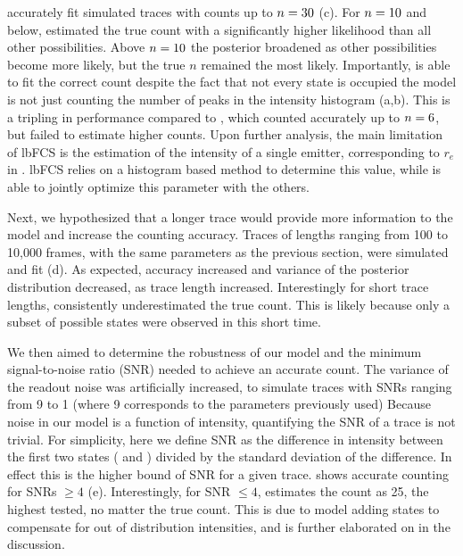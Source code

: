 \ours accurately fit simulated traces with counts up to $n=30$ (c).
	For $n=10$ and below, \ours estimated the true count with a significantly 
	higher likelihood than all other possibilities. 
	Above $n=10$ the posterior broadened as other possibilities become more likely, 
	but the true $n$ remained the most likely.
	Importantly, \ours is able to fit the correct count despite the fact that 
	not every state is occupied \ie the model is not just counting the 
	number of peaks in the intensity histogram (a,b).
	This is a tripling in performance compared to \lbfcs, which counted 
	accurately up to $n=6$, but failed to estimate higher counts.
	Upon further analysis, the main limitation of lbFCS is the estimation of the 
	intensity of a single emitter, corresponding to $r_e$ in \ours. 
	lbFCS relies on a histogram based method to determine this value, while 
	\ours is able to jointly optimize this parameter with the others.

Next, we hypothesized that a longer trace would provide more 
information to the model and increase the counting accuracy.
	Traces of lengths ranging from 100 to 10,000 frames, with the same parameters 
	as the previous section, were simulated and fit (d).
	As expected, accuracy increased and variance of the posterior distribution decreased, 
	as trace length increased.
	Interestingly for short trace lengths, \ours consistently underestimated the true count. 
	This is likely because only a subset of possible states were observed in this short time. %

We then aimed to determine the robustness of our model and the minimum signal-to-noise ratio 
(SNR) needed to achieve an accurate count.
	The variance of the readout noise \camvar was artificially increased, 
	to simulate traces with SNRs ranging from 9 to 1 (where 9 
	corresponds to the parameters previously used)
	Because noise in our model is a function of intensity, quantifying the SNR of a trace 
	is not trivial. 
	For simplicity, here we define SNR as the difference in intensity between 
	the first two states ( and ) divided by the standard deviation of the difference. 
	In effect this is the higher bound of SNR for a given trace. 
	\ours shows accurate counting for SNRs $\geq 4$ (e). 
	Interestingly, for  SNR $\leq 4$, \ours estimates the count as 25, 
	the highest \n tested, no matter the true count. 
	This is due to model adding states to compensate for out of distribution intensities, 
	and is further elaborated on in the discussion. 

